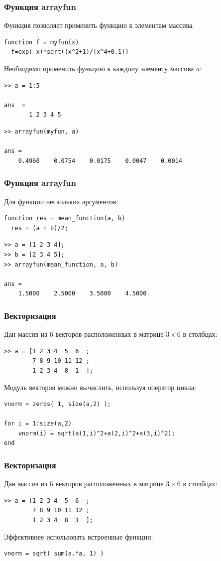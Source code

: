 \documentclass[12pt, compress]{beamer}
\begin{document}
\begin{frame}[fragile]
\frametitle{Функция arrayfun}
Функция  позволяет применить функцию к элементам массива.
\begin{lstlisting}
function f = myfun(x)
  f=exp(-x)*sqrt((x^2+1)/(x^4+0.1))
\end{lstlisting}
Необходимо применить функцию  к каждоиу элементу массива $a$:
\begin{lstlisting}
>> a = 1:5

ans  =
       1 2 3 4 5 
\end{lstlisting}
\begin{lstlisting}
>> arrayfun(myfun, a)

ans =
    0.4960    0.0754    0.0175    0.0047    0.0014
\end{lstlisting}
\end{frame}

\begin{frame}[fragile]
\frametitle{Функция arrayfun}
Для функции нескольких аргументов:
\begin{lstlisting}
function res = mean_function(a, b)
  res = (a + b)/2;
\end{lstlisting}
\begin{lstlisting}
>> a = [1 2 3 4];
>> b = [2 3 4 5];
>> arrayfun(mean_function, a, b)

ans =
    1.5000    2.5000    3.5000    4.5000
\end{lstlisting}
\end{frame}

\begin{frame}[fragile]
\frametitle{Векторизация}
Дан массив из 6 векторов расположенных в матрице $3 \times 6$ в столбцах:
\begin{lstlisting}
>> a = [1 2 3 4  5  6  ;
        7 8 9 10 11 12 ;
        1 2 3 4  8  1  ];
\end{lstlisting}     
Модуль векторов можно вычислить, используя оператор цикла:
\begin{lstlisting}
vnorm = zeros( 1, size(a,2) );

for i = 1:size(a,2)
    vnorm(i) = sqrt(a(1,i)^2+a(2,i)^2+a(3,i)^2);
end
\end{lstlisting}
\end{frame}

\begin{frame}[fragile]
\frametitle{Векторизация}
Дан массив из 6 векторов расположенных в матрице $3 \times 6$ в столбцах:
\begin{lstlisting}
>> a = [1 2 3 4  5  6  ;
        7 8 9 10 11 12 ;
        1 2 3 4  8  1  ];
\end{lstlisting}     
Эффективнее использовать встроенные функции:
\begin{lstlisting}
vnorm = sqrt( sum(a.*a, 1) )
\end{lstlisting}
\end{frame}
%
\end{document}
